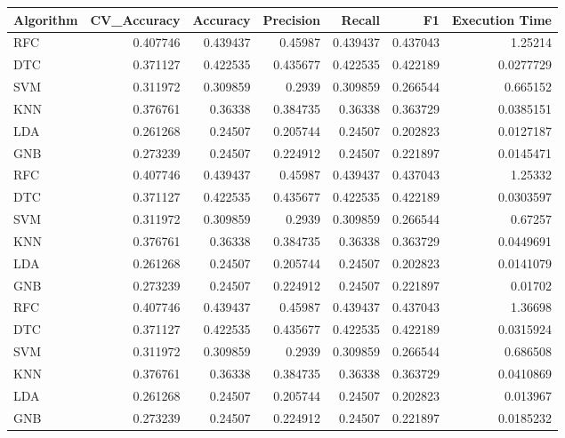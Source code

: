 \documentclass[conference,onecolumn]{IEEEtran}
\begin{document}
    \begin{tabular}{lrrrrrr}
        \hline
         Algorithm   &   CV\_Accuracy &   Accuracy &   Precision &   Recall &       F1 &   Execution Time \\
        \hline
         RFC         &      0.407746 &   0.439437 &    0.45987  & 0.439437 & 0.437043 &        1.25214   \\
         DTC         &      0.371127 &   0.422535 &    0.435677 & 0.422535 & 0.422189 &        0.0277729 \\
         SVM         &      0.311972 &   0.309859 &    0.2939   & 0.309859 & 0.266544 &        0.665152  \\
         KNN         &      0.376761 &   0.36338  &    0.384735 & 0.36338  & 0.363729 &        0.0385151 \\
         LDA         &      0.261268 &   0.24507  &    0.205744 & 0.24507  & 0.202823 &        0.0127187 \\
         GNB         &      0.273239 &   0.24507  &    0.224912 & 0.24507  & 0.221897 &        0.0145471 \\
         RFC         &      0.407746 &   0.439437 &    0.45987  & 0.439437 & 0.437043 &        1.25332   \\
         DTC         &      0.371127 &   0.422535 &    0.435677 & 0.422535 & 0.422189 &        0.0303597 \\
         SVM         &      0.311972 &   0.309859 &    0.2939   & 0.309859 & 0.266544 &        0.67257   \\
         KNN         &      0.376761 &   0.36338  &    0.384735 & 0.36338  & 0.363729 &        0.0449691 \\
         LDA         &      0.261268 &   0.24507  &    0.205744 & 0.24507  & 0.202823 &        0.0141079 \\
         GNB         &      0.273239 &   0.24507  &    0.224912 & 0.24507  & 0.221897 &        0.01702   \\
         RFC         &      0.407746 &   0.439437 &    0.45987  & 0.439437 & 0.437043 &        1.36698   \\
         DTC         &      0.371127 &   0.422535 &    0.435677 & 0.422535 & 0.422189 &        0.0315924 \\
         SVM         &      0.311972 &   0.309859 &    0.2939   & 0.309859 & 0.266544 &        0.686508  \\
         KNN         &      0.376761 &   0.36338  &    0.384735 & 0.36338  & 0.363729 &        0.0410869 \\
         LDA         &      0.261268 &   0.24507  &    0.205744 & 0.24507  & 0.202823 &        0.013967  \\
         GNB         &      0.273239 &   0.24507  &    0.224912 & 0.24507  & 0.221897 &        0.0185232 \\
        \hline
    \end{tabular}
        
\end{document}
